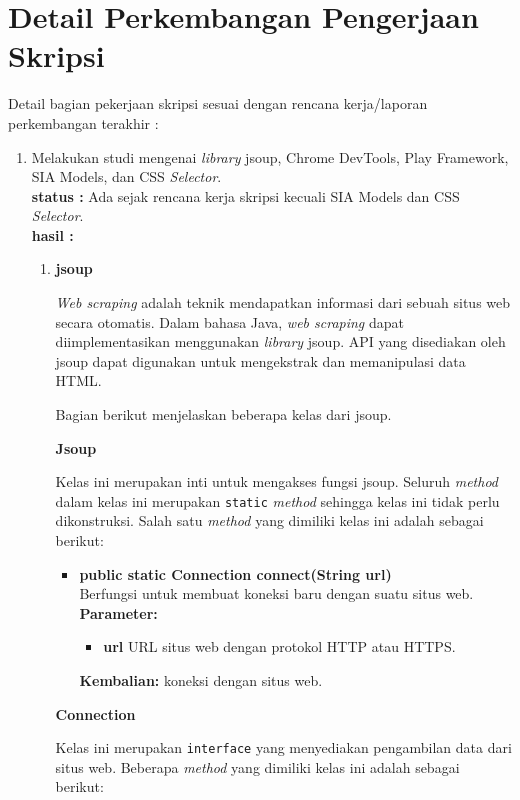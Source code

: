 \documentclass[a4paper,twoside]{article}
\begin{document}
\section{Detail Perkembangan Pengerjaan Skripsi}
Detail bagian pekerjaan skripsi sesuai dengan rencana kerja/laporan perkembangan terakhir :
	\begin{enumerate}
		\item Melakukan studi mengenai \textit{library} jsoup, Chrome DevTools, Play Framework, SIA Models, dan CSS \textit{Selector}.\\
		{\bf status :} Ada sejak rencana kerja skripsi kecuali SIA Models dan CSS \textit{Selector}.\\
		{\bf hasil :} \\
		\begin{enumerate}
			
		
\item \textbf{jsoup}

\textit{Web scraping} adalah teknik mendapatkan informasi dari sebuah situs web secara otomatis\cite{Vargiu:2013}. Dalam bahasa Java, \textit{web scraping} dapat diimplementasikan menggunakan \textit{library} jsoup\cite{jsoup}. API yang disediakan oleh jsoup dapat digunakan untuk mengekstrak dan memanipulasi data HTML. 

Bagian berikut menjelaskan beberapa kelas dari jsoup.

\textbf{Jsoup}

Kelas ini merupakan inti untuk mengakses fungsi jsoup. Seluruh \textit{method} dalam kelas ini merupakan \texttt{static} \textit{method} sehingga kelas ini tidak perlu dikonstruksi. Salah satu \textit{method} yang dimiliki kelas ini adalah sebagai berikut:
\begin{itemize}
	\item \textbf{public static Connection connect(String url)} \\
		Berfungsi untuk membuat koneksi baru dengan suatu situs web. \\
		\textbf{Parameter:}
		\begin{itemize}
			\item \textbf{url} URL situs web dengan protokol HTTP atau HTTPS.
		\end{itemize}
		\textbf{Kembalian:} koneksi dengan situs web.
\end{itemize}

\textbf{Connection}

Kelas ini merupakan \texttt{interface} yang menyediakan pengambilan data dari situs web. Beberapa \textit{method} yang dimiliki kelas ini adalah sebagai berikut:


\end{enumerate}
\end{enumerate}
\end{document}
